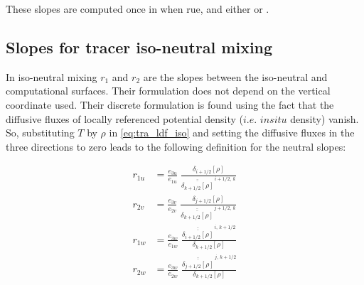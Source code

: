 \documentclass[../main/NEMO_manual]{subfiles}
\begin{document}

These slopes are computed once in  when rue,
and either  or . 

\subsection{Slopes for tracer iso-neutral mixing}
\label{subsec:LDF_slp_iso}

In iso-neutral mixing  $r_1$ and $r_2$ are the slopes between the iso-neutral and computational surfaces.
Their formulation does not depend on the vertical coordinate used.
Their discrete formulation is found using the fact that the diffusive fluxes of
locally referenced potential density ($i.e.$ $in situ$ density) vanish.
So, substituting $T$ by $\rho$ in \autoref{eq:tra_ldf_iso} and setting the diffusive fluxes in
the three directions to zero leads to the following definition for the neutral slopes:

\begin{equation}
  \label{eq:ldfslp_iso}
  \begin{split}
    r_{1u} &= \frac{e_{3u}}{e_{1u}}\; \frac{\delta_{i+1/2}[\rho]}
    {\overline{\overline{\delta_{k+1/2}[\rho]}}^{\,i+1/2,\,k}} \\
    r_{2v} &= \frac{e_{3v}}{e_{2v}}\; \frac{\delta_{j+1/2}\left[\rho \right]}
    {\overline{\overline{\delta_{k+1/2}[\rho]}}^{\,j+1/2,\,k}} \\
    r_{1w} &= \frac{e_{3w}}{e_{1w}}\;
    \frac{\overline{\overline{\delta_{i+1/2}[\rho]}}^{\,i,\,k+1/2}}
    {\delta_{k+1/2}[\rho]} \\
    r_{2w} &= \frac{e_{3w}}{e_{2w}}\;
    \frac{\overline{\overline{\delta_{j+1/2}[\rho]}}^{\,j,\,k+1/2}}
    {\delta_{k+1/2}[\rho]}
  \end{split}
\end{equation}

\end{document}

